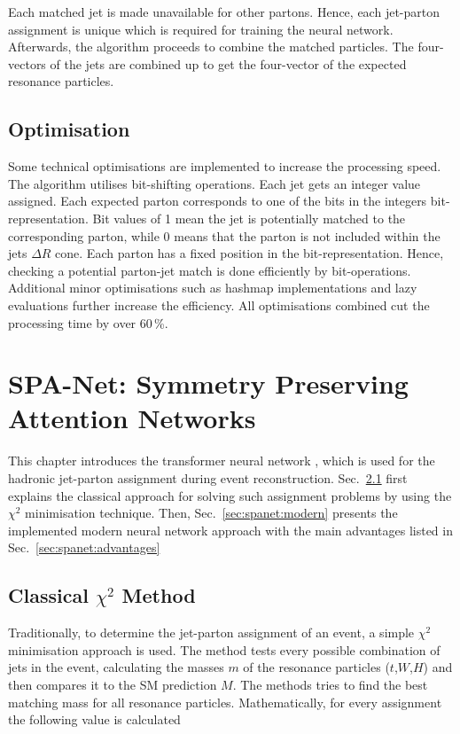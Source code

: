 \documentclass[bachelor,ngerman,english]{GAUBM}
\begin{document}
Each matched jet is made unavailable for other partons. Hence, each jet-parton assignment is unique which is required for training the neural network. Afterwards, the algorithm proceeds to combine the matched particles. The four-vectors of the jets are combined up to get the four-vector of the expected resonance particles.

\section{Optimisation}
Some technical optimisations are implemented to increase the processing speed. The algorithm utilises bit-shifting operations. Each jet gets an integer value assigned. Each expected parton corresponds to one of the bits in the integers bit-representation. Bit values of 1 mean the jet is potentially matched to the corresponding parton, while 0 means that the parton is not included within the jets $\Delta R$ cone. Each parton has a fixed position in the bit-representation. Hence, checking a potential parton-jet match is done efficiently by bit-operations. Additional minor optimisations such as hashmap implementations and lazy evaluations further increase the efficiency. All optimisations combined cut the processing time by over 60\,\%.

\chapter{SPA-Net: Symmetry Preserving Attention Networks}
\label{ch:spanet}
This chapter introduces the transformer neural network \spanet \cite{spanet_01,spanet_02}, which is used for the hadronic jet-parton assignment during event reconstruction. Sec.~\ref{sec:spanet:chi_squared} first explains the classical approach for solving such assignment problems by using the $\chi^2$ minimisation technique. Then, Sec.~\ref{sec:spanet:modern} presents the implemented modern neural network approach with the main advantages listed in Sec.~\ref{sec:spanet:advantages}

\section{Classical \texorpdfstring{$\chi^2$}{Chi Squared} Method}
\label{sec:spanet:chi_squared}
Traditionally, to determine the jet-parton assignment of an event, a simple $\chi^2$ minimisation approach \cite{nn:chi_squared} is used. The method tests every possible combination of jets in the event, calculating the masses $m$ of the resonance particles ($t$,$W$,$H$) and then compares it to the SM prediction $M$. The methods tries to find the best matching mass for all resonance particles. Mathematically, for every assignment the following value is calculated
\end{document}
